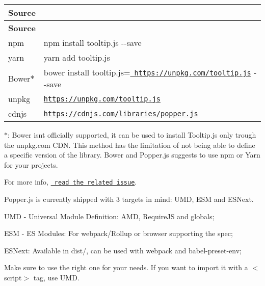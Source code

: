 \tabulinesep=1mm
\begin{longtabu}spread 0pt [c]{*{2}{|X[-1]}|}
\hline
\cellcolor{\tableheadbgcolor}\textbf{ Source  }&\cellcolor{\tableheadbgcolor}\textbf{ }\\
\endfirsthead
\hline
\endfoot
\hline
\cellcolor{\tableheadbgcolor}\textbf{ Source  }&\cellcolor{\tableheadbgcolor}\textbf{ }\\
\endhead
npm  &{\ttfamily npm install tooltip.\+js -\/-\/save}   \\
yarn  &{\ttfamily yarn add tooltip.\+js}   \\
Bower$\ast$  &{\ttfamily bower install tooltip.\+js=\href{https://unpkg.com/tooltip.js}{\texttt{ https\+://unpkg.\+com/tooltip.\+js}} -\/-\/save}   \\
unpkg  &\href{https://unpkg.com/tooltip.js}{\texttt{ {\ttfamily https\+://unpkg.\+com/tooltip.\+js}}}   \\
cdnjs  &\href{https://cdnjs.com/libraries/popper.js}{\texttt{ {\ttfamily https\+://cdnjs.\+com/libraries/popper.\+js}}}   \\
\end{longtabu}


$\ast$\+: Bower isn\textquotesingle{}t officially supported, it can be used to install Tooltip.\+js only trough the unpkg.\+com C\+DN. This method has the limitation of not being able to define a specific version of the library. Bower and Popper.\+js suggests to use npm or Yarn for your projects.

For more info, \href{https://github.com/FezVrasta/popper.js/issues/390}{\texttt{ read the related issue}}.

Popper.\+js is currently shipped with 3 targets in mind\+: U\+MD, E\+SM and E\+S\+Next.


\begin{DoxyItemize}
\item U\+MD -\/ Universal Module Definition\+: A\+MD, Require\+JS and globals;
\item E\+SM -\/ ES Modules\+: For webpack/\+Rollup or browser supporting the spec;
\item E\+S\+Next\+: Available in {\ttfamily dist/}, can be used with webpack and {\ttfamily babel-\/preset-\/env};
\end{DoxyItemize}

Make sure to use the right one for your needs. If you want to import it with a {\ttfamily $<$script$>$} tag, use U\+MD.

